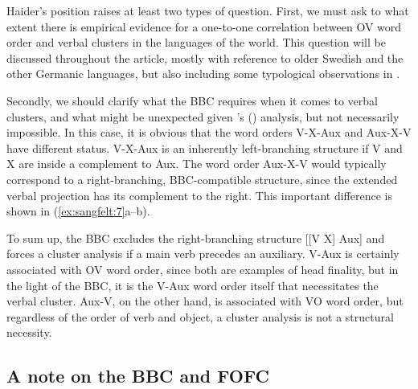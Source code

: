 \documentclass[output=paper, colorlinks, citecolor=brown]{langscibook}
\begin{document}
\ea
\label{ex:sangfelt:6}
 \label{ex:sangfelt:6a}
 \label{ex:sangfelt:6b}
\z
\z 


 Haider’s position raises at least two types of question. First, we must ask to what extent there is empirical evidence for a one-to-one correlation between OV word order and verbal clusters in the languages of the world. This question will be discussed throughout the article, mostly with reference to older Swedish and the other Germanic languages, but also including some typological observations in .

Secondly, we should clarify what the BBC requires when it comes to verbal clusters, and what might be unexpected given \citeauthor{Haider2010}’s (\citeyear{Haider2010, Haider2013}) analysis, but not necessarily impossible. In this case, it is obvious that the word orders V-X-Aux and Aux-X-V have different status. V-X-Aux is an inherently left-branching structure if V and X are inside a complement to Aux. The word order Aux-X-V would typically correspond to a right-branching, BBC-compatible structure, since the extended verbal projection has its complement to the right. This important difference is shown in (\ref{ex:sangfelt:7}a–b).


\ea
\label{ex:sangfelt:7}
\ex{[\textsubscript{VP1} \textit{Aux} [\textsubscript{VP2} \textit{X V}]\label{ex:sangfelt:7b}}
\z 
\z 

To sum up, the BBC excludes the right-branching structure [[V X] Aux] and forces a cluster analysis if a main verb precedes an auxiliary. V-Aux is certainly associated with OV word order, since both are examples of head finality, but in the light of the BBC, it is the V-Aux word order itself that necessitates the verbal cluster. Aux-V, on the other hand, is associated with VO word order, but regardless of the order of verb and object, a cluster analysis is not a structural necessity.

\subsection{A note on the BBC and FOFC}\label{sec:sangfelt:2.2}
\end{document}
